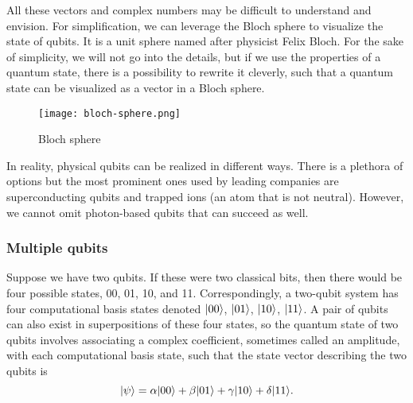 All these vectors and complex numbers may be difficult to understand and envision. For simplification, we can leverage the Bloch sphere to visualize the state of qubits. It is a unit sphere named after physicist Felix Bloch. For the sake of simplicity, we will not go into the details, but if we use the properties of a quantum state, there is a possibility to rewrite it cleverly, such that a quantum state can be visualized as a vector in a Bloch sphere.

\begin{figure}[H]
    \begin{center}
       \texttt{[image: bloch-sphere.png]}
       \caption{Bloch sphere \cite{bloch_sphere}}
    \end{center}
\end{figure} 


In reality, physical qubits can be realized in different ways. There is a plethora of options but the most prominent ones used by leading companies are superconducting qubits and trapped ions (an atom that is not neutral). However, we cannot omit photon-based qubits that can succeed as well.  

\subsubsection{Multiple qubits}
Suppose we have two qubits. If these were two classical bits, then there would be four possible states, 00, 01, 10, and 11. Correspondingly, a two-qubit system has four computational basis states denoted $\lvert00\rangle$, $\lvert01\rangle$, $\lvert10\rangle$, $\lvert11\rangle$. A pair of qubits can also exist in superpositions of these four states, so the quantum state of two qubits involves associating a complex coefficient, sometimes called an amplitude, with each computational basis state, such that the state vector describing the two qubits is~\cite{qc}
$$\lvert\psi\rangle = \alpha \lvert00\rangle + \beta \lvert01\rangle + \gamma \lvert10\rangle + \delta \lvert11\rangle\text{.}$$

